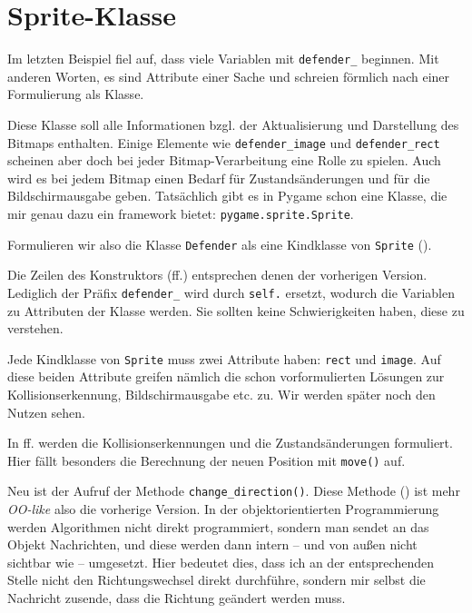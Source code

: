 \newpage
\section{Sprite-Klasse}
Im letzten Beispiel fiel auf, dass viele Variablen mit \texttt{defender\_} beginnen. Mit anderen Worten, es sind Attribute einer Sache und schreien förmlich nach einer Formulierung als Klasse. 

Diese Klasse soll alle Informationen bzgl. der Aktualisierung und Darstellung des Bitmaps enthalten. Einige Elemente wie \texttt{defender\_image} und \texttt{defender\_rect} scheinen aber doch bei jeder Bitmap-Verarbeitung eine Rolle zu spielen. Auch wird es bei jedem Bitmap einen Bedarf für Zustandsänderungen und für die Bildschirmausgabe geben. Tatsächlich gibt es in Pygame schon eine Klasse, die mir genau dazu ein \Gls{framework} bietet: \texttt{pygame.sprite.Sprite}. 

Formulieren wir also die Klasse \texttt{Defender} als eine Kindklasse von \texttt{Sprite} ().


Die Zeilen des Konstruktors (ff.) entsprechen denen der vorherigen Version. Lediglich der Präfix \texttt{defender\_} wird durch \texttt{self.} ersetzt, wodurch die Variablen zu Attributen der Klasse werden. Sie sollten keine Schwierigkeiten haben, diese zu verstehen.

Jede Kindklasse von \texttt{Sprite} muss zwei Attribute haben: \texttt{rect} und \texttt{image}. Auf diese beiden Attribute greifen nämlich die schon vorformulierten Lösungen zur Kollisionserkennung, Bildschirmausgabe etc. zu. Wir werden später noch den Nutzen sehen.

In ff. werden die Kollisionserkennungen und die Zustandsänderungen formuliert. Hier fällt besonders die Berechnung der neuen Position mit \texttt{move()} auf. 

Neu ist der Aufruf der Methode \texttt{change\_direction()}. Diese Methode () ist mehr \emph{OO-like} also die vorherige Version. In der objektorientierten Programmierung werden Algorithmen nicht direkt programmiert, sondern man sendet an das Objekt Nachrichten, und diese werden dann intern -- und von außen nicht sichtbar wie -- umgesetzt. Hier bedeutet dies, dass ich an der entsprechenden Stelle nicht den Richtungswechsel direkt durchführe, sondern mir selbst die Nachricht zusende, dass die Richtung geändert werden muss. 

